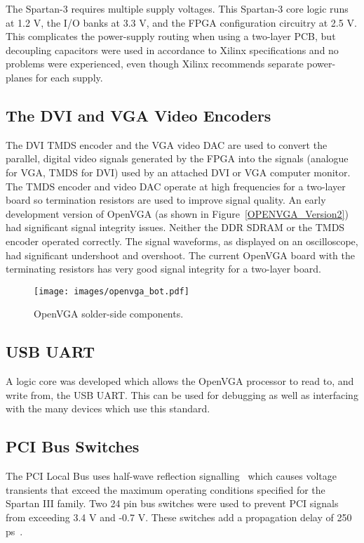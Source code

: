 The Spartan-3 requires multiple supply voltages. This Spartan-3 core logic runs
at 1.2 V, the I/O banks at 3.3 V, and the FPGA configuration circuitry at 2.5 V.
This complicates the power-supply routing when using a two-layer PCB, but
decoupling capacitors were used in accordance to Xilinx specifications and no
problems were experienced, even though Xilinx recommends separate power-planes
for each supply.


\subsection{The DVI and VGA Video Encoders}
The DVI TMDS encoder and the VGA video DAC are used to convert the parallel,
digital video signals generated by the FPGA into the signals (analogue for VGA,
TMDS for DVI) used by an attached DVI or VGA computer monitor. The TMDS encoder
and video DAC operate at high frequencies for a two-layer board so termination
resistors are used to improve signal quality. An early development version of
OpenVGA (as shown in Figure~\ref{OPENVGA_Version2}) had significant signal
integrity issues. Neither the DDR SDRAM or the TMDS encoder operated correctly.
The signal waveforms, as displayed on an oscilloscope, had significant undershoot
and overshoot. The current OpenVGA board with the terminating resistors has very
good signal integrity for a two-layer board.

\begin{figure}[h!]
\begin{center}
\texttt{[image: images/openvga\_bot.pdf]}
\end{center}
\caption[OpenVGA solder-side components]{OpenVGA solder-side components.}
\label{HARD_Bot}
\end{figure}


\subsection{USB UART}
A logic core was developed which allows the OpenVGA processor to read to, and
write from, the USB UART. This can be used for debugging as well as interfacing
with the many devices which use this standard.


\subsection{PCI Bus Switches}
The PCI Local Bus uses half-wave reflection signalling~\cite{PCI_Spec, PCI_Book}
which causes voltage transients that exceed the maximum operating conditions
specified for the Spartan III family\cite{Xilinx_SP3_DS}. Two 24 pin bus switches
were used to prevent PCI signals from exceeding 3.4 V and -0.7 V. These switches
add a propagation delay of 250 ps~\cite{Bus_Switch_DS}.

